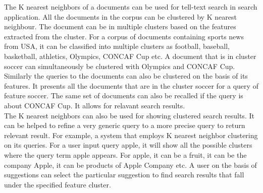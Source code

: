 \documentclass[12pt]{report}
\begin{document}
The K nearest neighbors of a documents can be used for tell-text search in search application. All the documents in the corpus can be clustered by K nearest neighbour. The document can be in multiple clusters based on the features extracted from the cluster. For a corpus of documents containing sports news from USA, it can be classified into multiple clusters as football, baseball, basketball, athletics, Olympics, CONCAF Cup etc. A document that is in cluster soccer can simultaneously be clustered with Olympics and CONCAF Cup. Similarly the queries to the documents can also be clustered on the basis of its features. It presents all the documents that are in the cluster soccer for a query of feature soccer. The same set of documents can also be recalled if the query is about CONCAF Cup. It allows for relavant search results.\\

The K nearest neighbors can also be used for showing clustered search results. It can be helped to refine a very generic query to a more precise query to return relevant result. For example, a system that employs K nearest neighbor clustering on its queries. For a user input query apple, it will show all the possible clusters where the query term apple appears. For apple, it can be a fruit, it can be the company Apple, it can be products of Apple Company etc. A user on the basis of suggestions can select the particular suggestion  to find search results that fall under the specified feature cluster.\\ 
  
   
   




  
\end{document}
